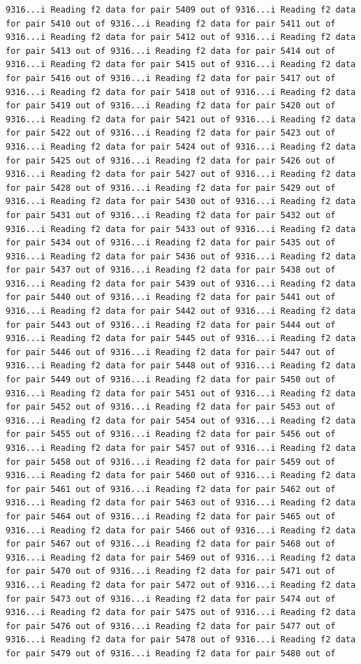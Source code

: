 \documentclass[
]{article}
\begin{document}
\begin{verbatim}
9316...i Reading f2 data for pair 5409 out of 9316...i Reading f2 data for pair 5410 out of 9316...i Reading f2 data for pair 5411 out of 9316...i Reading f2 data for pair 5412 out of 9316...i Reading f2 data for pair 5413 out of 9316...i Reading f2 data for pair 5414 out of 9316...i Reading f2 data for pair 5415 out of 9316...i Reading f2 data for pair 5416 out of 9316...i Reading f2 data for pair 5417 out of 9316...i Reading f2 data for pair 5418 out of 9316...i Reading f2 data for pair 5419 out of 9316...i Reading f2 data for pair 5420 out of 9316...i Reading f2 data for pair 5421 out of 9316...i Reading f2 data for pair 5422 out of 9316...i Reading f2 data for pair 5423 out of 9316...i Reading f2 data for pair 5424 out of 9316...i Reading f2 data for pair 5425 out of 9316...i Reading f2 data for pair 5426 out of 9316...i Reading f2 data for pair 5427 out of 9316...i Reading f2 data for pair 5428 out of 9316...i Reading f2 data for pair 5429 out of 9316...i Reading f2 data for pair 5430 out of 9316...i Reading f2 data for pair 5431 out of 9316...i Reading f2 data for pair 5432 out of 9316...i Reading f2 data for pair 5433 out of 9316...i Reading f2 data for pair 5434 out of 9316...i Reading f2 data for pair 5435 out of 9316...i Reading f2 data for pair 5436 out of 9316...i Reading f2 data for pair 5437 out of 9316...i Reading f2 data for pair 5438 out of 9316...i Reading f2 data for pair 5439 out of 9316...i Reading f2 data for pair 5440 out of 9316...i Reading f2 data for pair 5441 out of 9316...i Reading f2 data for pair 5442 out of 9316...i Reading f2 data for pair 5443 out of 9316...i Reading f2 data for pair 5444 out of 9316...i Reading f2 data for pair 5445 out of 9316...i Reading f2 data for pair 5446 out of 9316...i Reading f2 data for pair 5447 out of 9316...i Reading f2 data for pair 5448 out of 9316...i Reading f2 data for pair 5449 out of 9316...i Reading f2 data for pair 5450 out of 9316...i Reading f2 data for pair 5451 out of 9316...i Reading f2 data for pair 5452 out of 9316...i Reading f2 data for pair 5453 out of 9316...i Reading f2 data for pair 5454 out of 9316...i Reading f2 data for pair 5455 out of 9316...i Reading f2 data for pair 5456 out of 9316...i Reading f2 data for pair 5457 out of 9316...i Reading f2 data for pair 5458 out of 9316...i Reading f2 data for pair 5459 out of 9316...i Reading f2 data for pair 5460 out of 9316...i Reading f2 data for pair 5461 out of 9316...i Reading f2 data for pair 5462 out of 9316...i Reading f2 data for pair 5463 out of 9316...i Reading f2 data for pair 5464 out of 9316...i Reading f2 data for pair 5465 out of 9316...i Reading f2 data for pair 5466 out of 9316...i Reading f2 data for pair 5467 out of 9316...i Reading f2 data for pair 5468 out of 9316...i Reading f2 data for pair 5469 out of 9316...i Reading f2 data for pair 5470 out of 9316...i Reading f2 data for pair 5471 out of 9316...i Reading f2 data for pair 5472 out of 9316...i Reading f2 data for pair 5473 out of 9316...i Reading f2 data for pair 5474 out of 9316...i Reading f2 data for pair 5475 out of 9316...i Reading f2 data for pair 5476 out of 9316...i Reading f2 data for pair 5477 out of 9316...i Reading f2 data for pair 5478 out of 9316...i Reading f2 data for pair 5479 out of 9316...i Reading f2 data for pair 5480 out of 
\end{verbatim}
\end{document}
